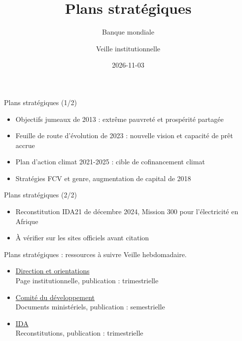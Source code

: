 \documentclass[aspectratio=169,11pt]{beamer}
\title{Plans stratégiques}
\subtitle{Banque mondiale}
\author{Veille institutionnelle}
\date{2026-11-03}
\begin{document}
\begin{frame}\titlepage\end{frame}

\begin{frame}{Plans stratégiques (1/2)}
\begin{itemize}
\item Objectifs jumeaux de 2013 : extrême pauvreté et prospérité partagée
\item Feuille de route d'évolution de 2023 : nouvelle vision et capacité de prêt accrue
\item Plan d'action climat 2021-2025 : cible de cofinancement climat
\item Stratégies FCV et genre, augmentation de capital de 2018
\end{itemize}
\end{frame}

\begin{frame}{Plans stratégiques (2/2)}
\begin{itemize}
\item Reconstitution IDA21 de décembre 2024, Mission 300 pour l'électricité en Afrique
\item À vérifier sur les sites officiels avant citation
\end{itemize}
\end{frame}

\begin{frame}{Plans stratégiques : ressources à suivre}
\small
Veille hebdomadaire.
\begin{itemize}
\item \href{https://www.worldbank.org/en/about/leadership}{Direction et orientations}\\{\footnotesize Page institutionnelle, publication : trimestrielle}
\item \href{https://www.devcommittee.org}{Comité du développement}\\{\footnotesize Documents ministériels, publication : semestrielle}
\item \href{https://ida.worldbank.org}{IDA}\\{\footnotesize Reconstitutions, publication : trimestrielle}
\end{itemize}
\end{frame}
\end{document}
